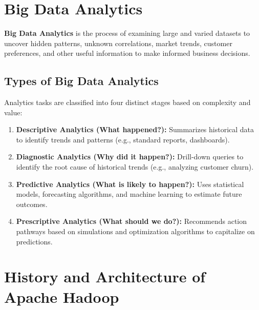 \documentclass[12pt,a4paper]{article}
\begin{document}
\section{Big Data Analytics}

\begin{tcolorbox}[defbox, title={Big Data Analytics}]
  \textbf{Big Data Analytics} is the process of examining large and varied datasets to uncover hidden patterns, unknown correlations, market trends, customer preferences, and other useful information to make informed business decisions.
\end{tcolorbox}

\subsection{Types of Big Data Analytics}
Analytics tasks are classified into four distinct stages based on complexity and value:

\begin{enumerate}[leftmargin=*, itemsep=3pt]
  \item \textbf{Descriptive Analytics (What happened?):} Summarizes historical data to identify trends and patterns (e.g., standard reports, dashboards).
  \item \textbf{Diagnostic Analytics (Why did it happen?):} Drill-down queries to identify the root cause of historical trends (e.g., analyzing customer churn).
  \item \textbf{Predictive Analytics (What is likely to happen?):} Uses statistical models, forecasting algorithms, and machine learning to estimate future outcomes.
  \item \textbf{Prescriptive Analytics (What should we do?):} Recommends action pathways based on simulations and optimization algorithms to capitalize on predictions.
\end{enumerate}

\section{History and Architecture of Apache Hadoop}
\end{document}
